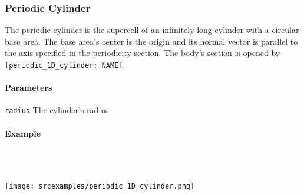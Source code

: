 \subsubsection{Periodic Cylinder}
The periodic cylinder is the supercell of an infinitely long cylinder with a circular base area. The base area's center is the origin and its normal vector is parallel to the axis specified in the periodicity section. The body's section is opened by \lstinline{[periodic_1D_cylinder: NAME]}.

\paragraph{Parameters}
\begin{description}
 \item{\lstinline{radius}} The cylinder's radius.
\end{description}

\paragraph{Example}\ 


\ \\\texttt{[image: srcexamples/periodic\_1D\_cylinder.png]}
